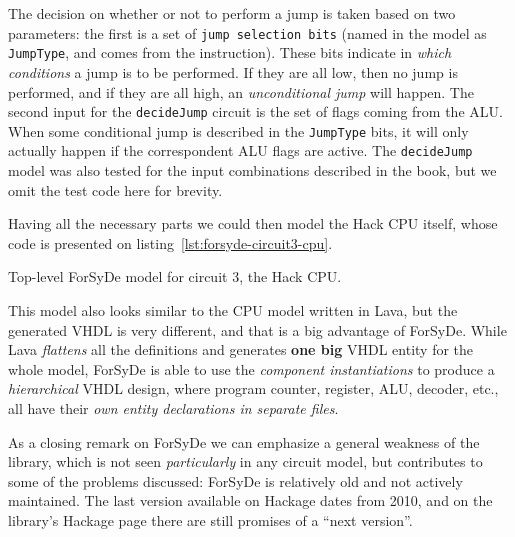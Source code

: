             The decision on whether or not to perform a jump is taken based on two parameters: the
            first is a set of \texttt{jump selection bits} (named in the model as \texttt{JumpType},
            and comes from the instruction). These bits indicate in \emph{which conditions} a jump
            is to be performed. If they are all low, then no jump is performed, and if they are all
            high, an \emph{unconditional jump} will happen.  The second input for the
            \texttt{decideJump} circuit is the set of flags coming from the ALU. When some
            conditional jump is described in the \texttt{JumpType} bits, it will only actually
            happen if the correspondent ALU flags are active. The \texttt{decideJump} model was also
            tested for the input combinations described in the book\cite{nand2tetris-book}, but we
            omit the test code here for brevity.

            Having all the necessary parts we could then model the Hack CPU itself, whose code is
            presented on listing~\ref{lst:forsyde-circuit3-cpu}.

            \begin{listing}[h!]
                \caption{Top-level ForSyDe model for circuit 3, the Hack CPU.
                    \label{lst:forsyde-circuit3-cpu}}
            \end{listing}

            This model also looks similar to the CPU model written in Lava, but the generated VHDL
            is very different, and that is a big advantage of ForSyDe. While Lava \emph{flattens}
            all the definitions and generates \textbf{one big} VHDL entity for the whole model,
            ForSyDe is able to use the \emph{component instantiations} to produce a
            \emph{hierarchical} VHDL design, where program counter, register, ALU, decoder, etc.,
            all have their \emph{own entity declarations in separate files}.

            As a closing remark on ForSyDe we can emphasize a general weakness of the library, which
            is not seen \emph{particularly} in any circuit model, but contributes to some of the
            problems discussed: ForSyDe is relatively old and not actively maintained. The last
            version available on Hackage\cite{website:forsyde-hackage} dates from 2010, and on the
            library's Hackage page there are still promises of a ``next version''.

